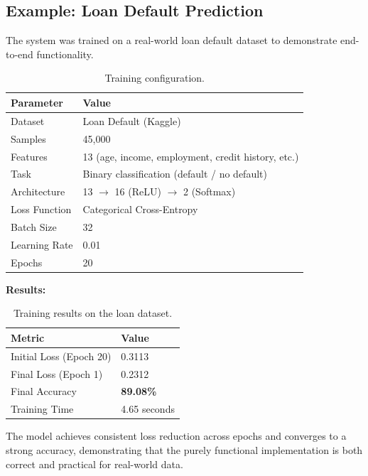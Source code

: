 \documentclass[12pt, a4paper]{article}
\begin{document}
\subsection{Example: Loan Default Prediction}

The system was trained on a real-world loan default dataset to demonstrate end-to-end functionality.

\begin{table}[h!]
\centering
\begin{tabular}{@{}ll@{}}
\toprule
\textbf{Parameter} & \textbf{Value} \\
\midrule
Dataset & Loan Default (Kaggle) \\
Samples & 45{,}000 \\
Features & 13 (age, income, employment, credit history, etc.) \\
Task & Binary classification (default / no default) \\
Architecture & 13 $\rightarrow$ 16 (ReLU) $\rightarrow$ 2 (Softmax) \\
Loss Function & Categorical Cross-Entropy \\
Batch Size & 32 \\
Learning Rate & 0.01 \\
Epochs & 20 \\
\bottomrule
\end{tabular}
\caption{Training configuration.}
\end{table}

\noindent\textbf{Results:}

\begin{table}[h!]
\centering
\begin{tabular}{@{}ll@{}}
\toprule
\textbf{Metric} & \textbf{Value} \\
\midrule
Initial Loss (Epoch 20) & 0.3113 \\
Final Loss (Epoch 1) & 0.2312 \\
Final Accuracy & \textbf{89.08\%} \\
Training Time & 4.65 seconds \\
\bottomrule
\end{tabular}
\caption{Training results on the loan dataset.}
\end{table}

The model achieves consistent loss reduction across epochs and converges to a strong accuracy, demonstrating that the purely functional implementation is both correct and practical for real-world data.

\end{document}
